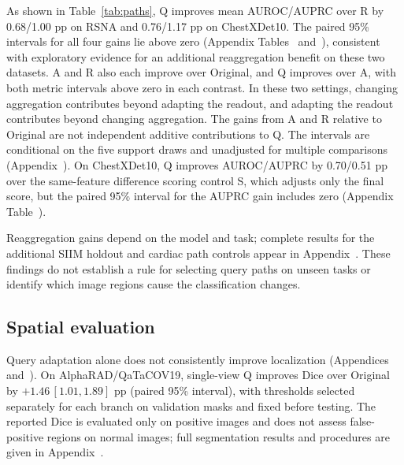 \documentclass[10pt,twocolumn,letterpaper]{article}
\begin{document}
As shown in Table~\ref{tab:paths}, Q improves mean AUROC/AUPRC over R by 0.68/1.00 pp on RSNA and 0.76/1.17 pp on ChestXDet10. The paired 95\% intervals for all four gains lie above zero (Appendix Tables~ and~), consistent with exploratory evidence for an additional reaggregation benefit on these two datasets. A and R also each improve over Original, and Q improves over A, with both metric intervals above zero in each contrast. In these two settings, changing aggregation contributes beyond adapting the readout, and adapting the readout contributes beyond changing aggregation. The gains from A and R relative to Original are not independent additive contributions to Q. The intervals are conditional on the five support draws and unadjusted for multiple comparisons (Appendix~). On ChestXDet10, Q improves AUROC/AUPRC by 0.70/0.51 pp over the same-feature difference scoring control S, which adjusts only the final score, but the paired 95\% interval for the AUPRC gain includes zero (Appendix Table~).

Reaggregation gains depend on the model and task; complete results for the additional SIIM holdout and cardiac path controls appear in Appendix~. These findings do not establish a rule for selecting query paths on unseen tasks or identify which image regions cause the classification changes.

\subsection{Spatial evaluation}
\label{sec:spatialresults}

Query adaptation alone does not consistently improve localization (Appendices~ and~). On AlphaRAD/QaTaCOV19, single-view Q improves Dice over Original by $+1.46\,[1.01,1.89]$ pp (paired 95\% interval), with thresholds selected separately for each branch on validation masks and fixed before testing. The reported Dice is evaluated only on positive images and does not assess false-positive regions on normal images; full segmentation results and procedures are given in Appendix~.
\end{document}
